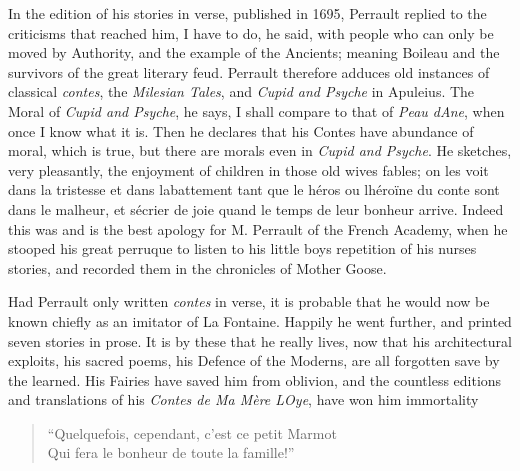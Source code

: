 \documentclass[14pt,a4paper]{memoir}
\begin{document}
In the edition of his stories in verse, published in 1695, Perrault
replied to the criticisms that reached him, \textquotesingle I have to
do,\textquotesingle{} he said, \textquotesingle with people who can only
be moved by Authority, and the example of the
Ancients;\textquotesingle{} meaning Boileau and the survivors of the
great literary feud. Perrault therefore adduces old instances of
classical \emph{contes}, the \emph{Milesian Tales}, and \emph{Cupid and
Psyche} in Apuleius. \textquotesingle The Moral of \emph{Cupid and
Psyche},\textquotesingle{} he says, \textquotesingle I shall compare to
that of \emph{Peau d\textquotesingle Ane}, when once I know what it
is.\textquotesingle{} Then he declares that his Contes have abundance of
moral, which is true, but there are morals even in \emph{Cupid and
Psyche}. He sketches, very pleasantly, the enjoyment of children in
those old wives\textquotesingle{} fables; \textquotesingle on les voit
dans la tristesse et dans l\textquotesingle abattement tant que le héros
ou l\textquotesingle héroïne du conte sont dans le malheur, et
s\textquotesingle écrier de joie quand le temps de leur bonheur
arrive.\textquotesingle{} Indeed this was and is the best apology for M.
Perrault of the French Academy, when he stooped his great perruque to
listen to his little boy\textquotesingle s repetition of his
nurse\textquotesingle s stories, and recorded them in the chronicles of
Mother Goose.

Had Perrault only written \emph{contes} in verse, it is probable that he
would now be known chiefly as an imitator of La Fontaine. Happily he
went further, and printed seven stories in prose. It is by these that he
really lives, now that his architectural exploits, his sacred poems, his
Defence of the Moderns, are all forgotten save by the learned. His
Fairies have saved him from oblivion, and the countless editions and
translations of his \emph{Contes de Ma Mère L\textquotesingle Oye}, have
won him
immortality

\begin{verse}
  \small
\enquote{Quelquefois, cependant, c'est ce petit Marmot \\
Qui fera le bonheur de toute la famille!}
\end{verse}
\end{document}
